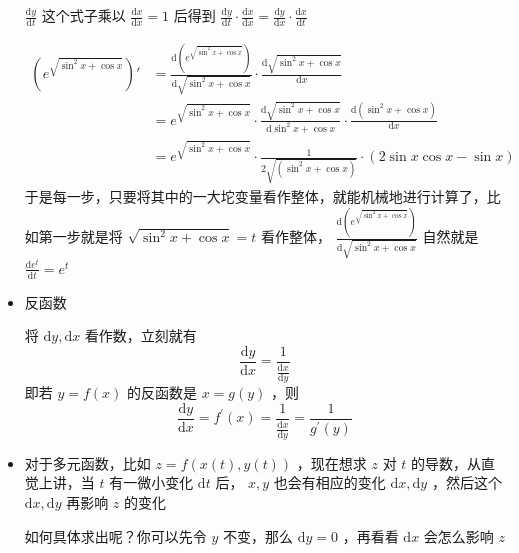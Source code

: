 \documentclass[lang=cn,newtx,10pt,scheme=chinese]{elegantbook}
\begin{document}
\begin{itemize}
          $\frac{\mathrm{d}y}{\mathrm{d}t}$ 这个式子乘以 $\frac{\mathrm{d}x}{\mathrm{d}x}=1$ 后得到 $\frac{\mathrm{d}y}{\mathrm{d}t} \cdot \frac{\mathrm{d}x}{\mathrm{d}x}=\frac{\mathrm{d}y}{\mathrm{d}x}\cdot \frac{\mathrm{d}x}{\mathrm{d}t}$
          \begin{example}
            \begin{equation}
              \begin{aligned}
              (e^{\sqrt{\sin ^{2}x+\cos x}})'&=\frac{\mathrm{d}(e^{\sqrt{\sin ^{2}x+\cos x}})}{\mathrm{d}\sqrt{\sin ^{2}x+\cos x}}\cdot \frac{\mathrm{d}\sqrt{\sin ^{2}x+\cos x}}{\mathrm{d}x} \\
              &=e^{\sqrt{\sin ^{2}x+\cos x}}\cdot \frac{\mathrm{d}\sqrt{\sin ^{2}x+\cos x}}{\mathrm{d}\sin ^{2}x+\cos x}\cdot \frac{\mathrm{d}(\sin ^{2}x+\cos x)}{\mathrm{d}x}\\
              &=e^{\sqrt{\sin ^{2}x+\cos x}}\cdot \frac{1}{2 \sqrt{(\sin ^{2}x+\cos x)}}\cdot (2 \sin x \cos x - \sin x )
              \end{aligned}
            \end{equation}
            于是每一步，只要将其中的一大坨变量看作整体，就能机械地进行计算了，比如第一步就是将 $\sqrt{\sin ^{2}x+\cos x}=t$ 看作整体， $\frac{\mathrm{d}(e^{\sqrt{\sin ^{2}x+\cos x}})}{\mathrm{d}\sqrt{\sin ^{2}x+\cos x}}$ 自然就是 $\frac{\mathrm{d}e^{t}}{\mathrm{d}t}=e^{t}$
          \end{example}
          \item 反函数
          
          将 $\mathrm{d}y,\mathrm{d}x$ 看作数，立刻就有
          \begin{equation}
            \frac{\mathrm{d}y}{\mathrm{d}x}=\frac{1}{\frac{\mathrm{d}x}{\mathrm{d}y}}
          \end{equation}
          即若 $y=f(x)$ 的反函数是 $x=g(y)$
        ，则
        \begin{equation}
          \frac{\mathrm{d}y}{\mathrm{d}x}=f^{\prime }(x)=\frac{1}{\frac{\mathrm{d}x}{\mathrm{d}y}}=\frac{1}{g^{\prime }(y)}
        \end{equation}
        \item 对于多元函数，比如 $z=f(x(t),y(t))$ ，现在想求 $z$ 对 $t$ 的导数，从直觉上讲，当 $t$ 有一微小变化 $\mathrm{d}t$ 后， $x,y$ 也会有相应的变化 $\mathrm{d}x,\mathrm{d}y$ ，然后这个 $\mathrm{d}x,\mathrm{d}y$ 再影响 $z$ 的变化
        
        如何具体求出呢？你可以先令 $y$ 不变，那么 $\mathrm{d}y=0$ ，再看看 $\mathrm{d}x$ 会怎么影响 $z$


\end{itemize}
\end{document}

